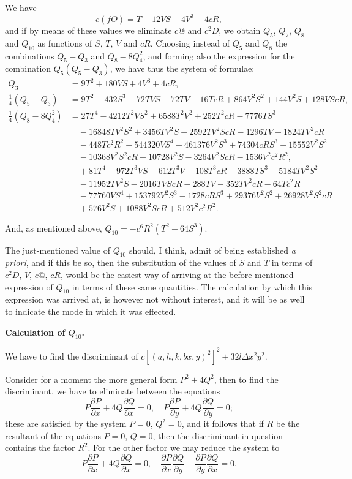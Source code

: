 \documentclass[11pt,a4paper]{article}
\theoremstyle{definition}
\begin{document}
\newpage

We have
\[
c(fO) = T - 12VS + 4V^3 - 4cR,
\]
and if by means of these values we eliminate $c\text{@}$ and $c^2D$, we obtain $Q_5$, $Q_7$, $Q_8$ and $Q_{10}$ as functions of $S$, $T$, $V$ and $cR$. Choosing instead of $Q_5$ and $Q_8$ the combinations $Q_5 - Q_3$ and $Q_8 - 8Q_4^2$, and forming also the expression for the combination $Q_5(Q_5 - Q_3)$, we have thus the system of formulae:
\begin{align*}
Q_3 &= 9T^2 + 180VS + 4V^3 + 4cR,\\
\tfrac{1}{4}(Q_5 - Q_3) &= 9T^2 - 432S^3 - 72TVS - 72TV - 16TcR + 864V^2S^2 + 144V^2S + 128VScR,\\
\tfrac{1}{4}(Q_8 - 8Q_4^2) &= 27T^4 - 4212T^2VS^2 + 6588T^2V^2 + 252T^2cR - 7776TS^3\\
&\quad - 16848TV^2S^2 + 3456TV^2S - 2592TV^2ScR - 1296TV - 1824TV^2cR\\
&\quad - 448Tc^2R^2 + 544320VS^4 - 461376V^2S^3 + 74304cRS^3 + 15552V^2S^2\\
&\quad - 10368V^2S^2cR - 10728V^2S - 3264V^2ScR - 1536V^2c^2R^2,\\
&\quad + 81T^4 + 972T^3VS - 612T^3V - 108T^3cR - 3888TS^3 - 5184TV^2S^2\\
&\quad - 11952TV^2S - 2016TVScR - 288TV - 352TV^2cR - 64Tc^2R\\
&\quad - 77760VS^4 + 153792V^2S^3 - 1728cRS^3 + 29376V^2S^2 + 26928V^2S^2cR\\
&\quad + 576V^2S + 1088V^2ScR + 512V^2c^2R^2.
\end{align*}

And, as mentioned above, $Q_{10} = -c^6R^2(T^2 - 64S^3)$.

The just-mentioned value of $Q_{10}$ should, I think, admit of being established \textit{a priori}, and if this be so, then the substitution of the values of $S$ and $T$ in terms of $c^2D$, $V$, $c\text{@}$, $cR$, would be the easiest way of arriving at the before-mentioned expression of $Q_{10}$ in terms of these same quantities. The calculation by which this expression was arrived at, is however not without interest, and it will be as well to indicate the mode in which it was effected.

\newpage

\noindent\textbf{Calculation of $Q_{10}$.}

We have to find the discriminant of $c[(a,h,k,b x,y)^2]^2 + 32l\Delta x^2y^2$.

Consider for a moment the more general form $P^2 + 4Q^2$, then to find the discriminant, we have to eliminate between the equations
\[
P\frac{\partial P}{\partial x} + 4Q\frac{\partial Q}{\partial x} = 0,\quad P\frac{\partial P}{\partial y} + 4Q\frac{\partial Q}{\partial y} = 0;
\]
these are satisfied by the system $P = 0$, $Q^2 = 0$, and it follows that if $R$ be the resultant of the equations $P = 0$, $Q = 0$, then the discriminant in question contains the factor $R^2$. For the other factor we may reduce the system to
\[
P\frac{\partial P}{\partial x} + 4Q\frac{\partial Q}{\partial x} = 0,\quad \frac{\partial P}{\partial x}\frac{\partial Q}{\partial y} - \frac{\partial P}{\partial y}\frac{\partial Q}{\partial x} = 0.
\]
\end{document}
